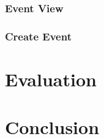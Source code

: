 \documentclass[a4paper,oneside,12pt,draft]{report}
\begin{document}
	\subsection{Event View}


	\subsection{Create Event}

	\chapter{Evaluation}

	\chapter{Conclusion}

	\printbibliography

	\printglossaries
\end{document}
